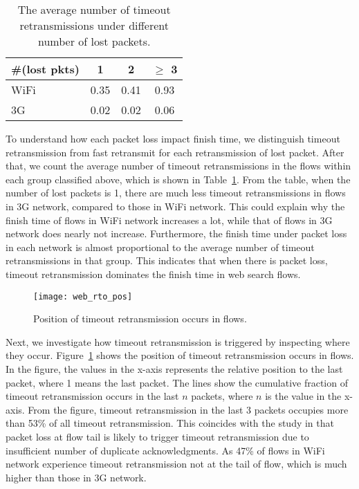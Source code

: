\begin{table}[th]
\caption{The average number of timeout retransmissions under different number of lost packets.}
\label{tab:web_rto_ratio}
\centering
\renewcommand{\arraystretch}{1.1}
\begin{tabular}{l|c|c|c}
	\toprule
	\#(lost pkts)  & 1 & 2 & $\ge$ 3 \\
	\midrule
	WiFi & 0.35 & 0.41 & 0.93 \\
	\hline
	3G & 0.02 & 0.02 & 0.06 \\
	\bottomrule
\end{tabular}
\end{table}

To understand how each packet loss impact finish time, we distinguish timeout retransmission from fast retransmit for each retransmission of lost packet. After that, we count the average number of timeout retransmissions in the flows within each group classified above, which is shown in Table~\ref{tab:web_rto_ratio}. From the table, when the number of lost packets is 1, there are much less timeout retransmissions in flows in 3G network, compared to those in WiFi network. This could explain why the finish time of flows in WiFi network increases a lot, while that of flows in 3G network does nearly not increase. Furthermore, the finish time under packet loss in each network is almost proportional to the average number of timeout retransmissions in that group. This indicates that when there is packet loss, timeout retransmission dominates the finish time in web search flows.

\begin{figure}[th]
\centering
\texttt{[image: web\_rto\_pos]}
\caption{Position of timeout retransmission occurs in flows.}
\label{fig:web_rto_pos}
\end{figure}

Next, we investigate how timeout retransmission is triggered by inspecting where they occur. Figure~\ref{fig:web_rto_pos} shows the position of timeout retransmission occurs in flows. In the figure, the values in the x-axis represents the relative position to the last packet, where 1 means the last packet. The lines show the cumulative fraction of timeout retransmission occurs in the last $n$ packets, where $n$ is the value in the x-axis. From the figure, timeout retransmission in the last 3 packets occupies more than 53\% of all timeout retransmission. This coincides with the study in \cite{flach2013reducing} that packet loss at flow tail is likely to trigger timeout retransmission due to insufficient number of duplicate acknowledgments. As 47\% of flows in WiFi network experience timeout retransmission not at the tail of flow, which is much higher than those in 3G network.


